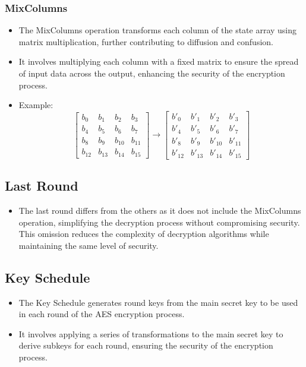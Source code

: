 \documentclass[11pt]{article}
\begin{document}
\subsubsection*{MixColumns}
\begin{itemize}
    \item The MixColumns operation transforms each column of the state array using matrix multiplication, further contributing to diffusion and confusion.
    \item It involves multiplying each column with a fixed matrix to ensure the spread of input data across the output, enhancing the security of the encryption process.
    \item Example:
    \[
    \begin{bmatrix}
    b_0 & b_1 & b_2 & b_3 \\
    b_4 & b_5 & b_6 & b_7 \\
    b_8 & b_9 & b_{10} & b_{11} \\
    b_{12} & b_{13} & b_{14} & b_{15}
    \end{bmatrix}
    \rightarrow
    \begin{bmatrix}
    b'_0 & b'_1 & b'_2 & b'_3 \\
    b'_4 & b'_5 & b'_6 & b'_7 \\
    b'_8 & b'_9 & b'_{10} & b'_{11} \\
    b'_{12} & b'_{13} & b'_{14} & b'_{15}
    \end{bmatrix}
    \]
\end{itemize}

\subsection*{Last Round}
\begin{itemize}
    \item The last round differs from the others as it does not include the MixColumns operation, simplifying the decryption process without compromising security. This omission reduces the complexity of decryption algorithms while maintaining the same level of security.
\end{itemize}

\subsection*{Key Schedule}
\begin{itemize}
    \item The Key Schedule generates round keys from the main secret key to be used in each round of the AES encryption process.
    \item It involves applying a series of transformations to the main secret key to derive subkeys for each round, ensuring the security of the encryption process.
\end{itemize}
\end{document}
